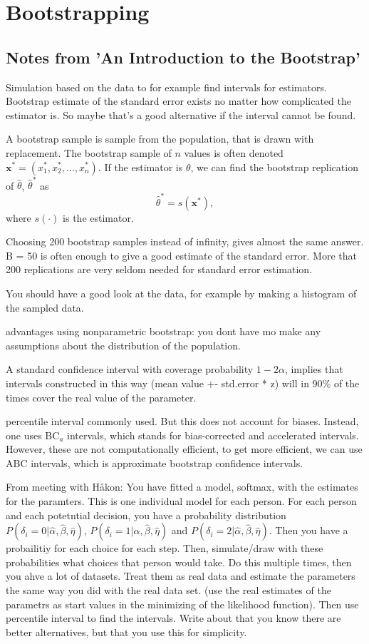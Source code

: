 \chapter{Bootstrapping}
\section{Notes from 'An Introduction to the Bootstrap'}
Simulation based on the data to for example find intervals for estimators. Bootstrap estimate of the standard error exists no matter how complicated the estimator is. So maybe that's a good alternative if the interval cannot be found. 

A bootstrap sample is sample from the population, that is drawn with replacement. The bootstrap sample of $n$ values is often denoted $\textbf{x}^*=(x_1^*,x_2^*,...,x_n^*)$. If the estimator is $\theta$, we can find the bootstrap replication of $\hat{\theta}$, $\hat{\theta}^*$ as
\begin{equation*}
    \hat{\theta}^* = s(\textbf{x}^*),
\end{equation*}
where $s(\cdot)$ is the estimator. 

Choosing 200 bootstrap samples instead of infinity, gives almost the same answer. B = 50 is often enough to give a good estimate of the standard error. More that 200 replications are very seldom needed for standard error estimation. 

You should have a good look at the data, for example by making a histogram of the sampled data. 

advantages using nonparametric bootstrap: you dont have mo make any assumptions about the distribution of the population.

A standard confidence interval with coverage probability $1-2\alpha$, implies that intervals constructed in this way (mean value +- std.error * z) will in 90\% of the times cover the real value of the parameter. 

percentile interval commonly used. But this does not account for biases. Instead, one uses BC$_a$ intervals, which stands for bias-corrected and accelerated intervals. However, these are not computationally efficient, to get more efficient, we can use ABC intervals, which is approximate bootstrap confidence intervals. 

From meeting with Håkon:
You have fitted a model, softmax, with the estimates for the paramters. This is one individual model for each person. For each person and each potetntial decision, you have a probability distribution $P(\delta_i=0| \hat{\alpha}, \hat{\beta}, \hat{\eta})$, $P(\delta_i=1| \hat{\alpha}, \hat{\beta}, \hat{\eta})$ and $P(\delta_i=2| \hat{\alpha}, \hat{\beta}, \hat{\eta})$.
Then you have a probailitiy for each choice for each step. Then, simulate/draw with these probabilities what choices that person would take. Do this multiple times, then you ahve a lot of datasets. Treat them as real data and estimate the parameters the same way you did with the real data set. (use the real estimates of the parametrs as start values in the minimizing of the likelihood function). Then use percentile interval to find the intervals. Write about that you know there are better alternatives, but that you use this for simplicity. 
